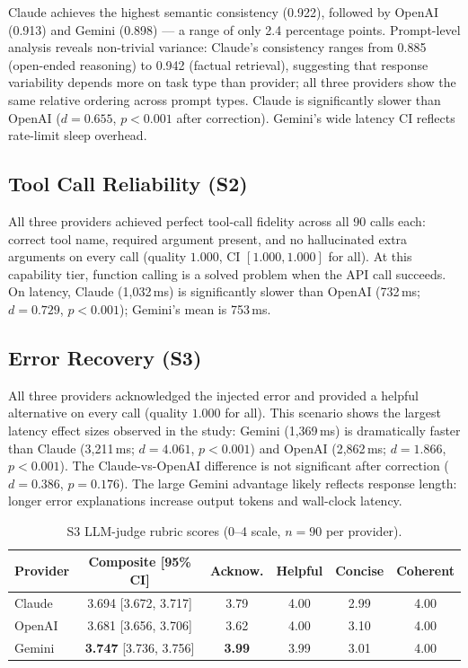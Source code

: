 \documentclass[11pt]{article}
\begin{document}
Claude achieves the highest semantic consistency (0.922), followed by OpenAI (0.913) and Gemini (0.898) --- a range of only 2.4 percentage points. Prompt-level analysis reveals non-trivial variance: Claude's consistency ranges from 0.885 (open-ended reasoning) to 0.942 (factual retrieval), suggesting that response variability depends more on task type than provider; all three providers show the same relative ordering across prompt types. Claude is significantly slower than OpenAI ($d{=}0.655$, $p{<}0.001$ after correction). Gemini's wide latency CI reflects rate-limit sleep overhead.

\subsection{Tool Call Reliability (S2)}

All three providers achieved perfect tool-call fidelity across all 90 calls each: correct tool name, required argument present, and no hallucinated extra arguments on every call (quality $1.000$, CI $[1.000, 1.000]$ for all). At this capability tier, function calling is a solved problem when the API call succeeds. On latency, Claude (1{,}032\,ms) is significantly slower than OpenAI (732\,ms; $d{=}0.729$, $p{<}0.001$); Gemini's mean is 753\,ms.

\subsection{Error Recovery (S3)}

All three providers acknowledged the injected error and provided a helpful alternative on every call (quality $1.000$ for all). This scenario shows the largest latency effect sizes observed in the study: Gemini (1{,}369\,ms) is dramatically faster than Claude (3{,}211\,ms; $d{=}4.061$, $p{<}0.001$) and OpenAI (2{,}862\,ms; $d{=}1.866$, $p{<}0.001$). The Claude-vs-OpenAI difference is not significant after correction ($d{=}0.386$, $p{=}0.176$). The large Gemini advantage likely reflects response length: longer error explanations increase output tokens and wall-clock latency.

\begin{table}[ht]
\centering
\small
\begin{tabular}{lccccc}
\toprule
\textbf{Provider} & \textbf{Composite [95\% CI]} & \textbf{Acknow.} & \textbf{Helpful} & \textbf{Concise} & \textbf{Coherent} \\
\midrule
Claude & 3.694 [3.672, 3.717] & 3.79 & 4.00 & 2.99 & 4.00 \\
OpenAI & 3.681 [3.656, 3.706] & 3.62 & 4.00 & 3.10 & 4.00 \\
Gemini & \textbf{3.747} [3.736, 3.756] & \textbf{3.99} & 3.99 & 3.01 & 4.00 \\
\bottomrule
\end{tabular}
\caption{S3 LLM-judge rubric scores (0--4 scale, $n{=}90$ per provider).}
\end{table}
\end{document}
